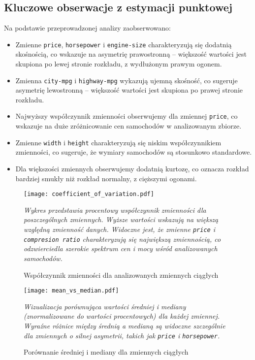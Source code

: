 \documentclass[12pt,a4paper]{article}
\begin{document}
\subsection{Kluczowe obserwacje z estymacji punktowej}

Na podstawie przeprowadzonej analizy zaobserwowano:

\begin{itemize}
    \item Zmienne \texttt{price}, \texttt{horsepower} i \texttt{engine-size} charakteryzują się dodatnią skośnością, co wskazuje na asymetrię prawostronną – większość wartości jest skupiona po lewej stronie rozkładu, z wydłużonym prawym ogonem.
    
    \item Zmienna \texttt{city-mpg} i \texttt{highway-mpg} wykazują ujemną skośność, co sugeruje asymetrię lewostronną – większość wartości jest skupiona po prawej stronie rozkładu.
    
    \item Najwyższy współczynnik zmienności obserwujemy dla zmiennej \texttt{price}, co wskazuje na duże zróżnicowanie cen samochodów w analizowanym zbiorze.
    
    \item Zmienne \texttt{width} i \texttt{height} charakteryzują się niskim współczynnikiem zmienności, co sugeruje, że wymiary samochodów są stosunkowo standardowe.
    
    \item Dla większości zmiennych obserwujemy dodatnią kurtozę, co oznacza rozkład bardziej smukły niż rozkład normalny, z cięższymi ogonami.
\end{itemize}

\begin{figure}[H]
    \centering
    \texttt{[image: coefficient\_of\_variation.pdf]}
    \caption{Współczynnik zmienności dla analizowanych zmiennych ciągłych}
    \label{fig:coefficient_of_variation}
    \small\textit{Wykres przedstawia procentowy współczynnik zmienności dla poszczególnych zmiennych. Wyższe wartości wskazują na większą względną zmienność danych. Widoczne jest, że zmienne \texttt{price} i \texttt{compresion ratio} charakteryzują się największą zmiennością, co odzwierciedla szerokie spektrum cen i mocy wśród analizowanych samochodów.}
\end{figure}

\begin{figure}[H]
    \centering
    \texttt{[image: mean\_vs\_median.pdf]}
    \caption{Porównanie średniej i mediany dla zmiennych ciągłych}
    \label{fig:mean_vs_median}
    \small\textit{Wizualizacja porównująca wartości średniej i mediany (znormalizowane do wartości procentowych) dla każdej zmiennej. Wyraźne różnice między średnią a medianą są widoczne szczególnie dla zmiennych o silnej asymetrii, takich jak \texttt{price} i \texttt{horsepower}.}
\end{figure}
\end{document}
